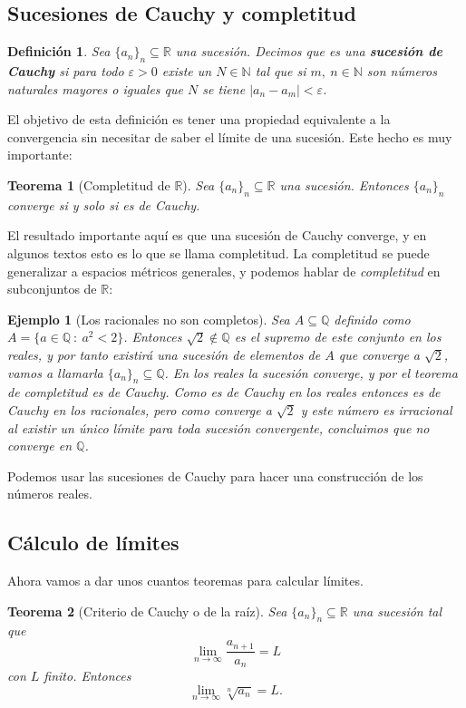 \documentclass{article}
\newtheorem{theorem}{Teorema}
\newtheorem{define}{Definición}
\newtheorem{ejem}{Ejemplo}
\newcommand{\reales}{\mathbb{R}}
\newcommand{\naturales}{\mathbb{N}}
\newcommand{\racionales}{\mathbb{Q}}
\newcommand{\sucesion}[1]{\{ #1 _n \}_n}
\newcommand{\sucreal}[1]{\{ #1 _n \}_n \subseteq \reales}
\begin{document}
\subsection{Sucesiones de Cauchy y completitud}
\begin{define}
	Sea $\sucreal{a}$ una sucesión. Decimos que es una \textbf{sucesión de Cauchy} si para todo $\varepsilon > 0$ existe un $N \in \naturales$ tal que si $m,\ n \in \naturales$ son números naturales mayores o iguales que $N$ se tiene $|a_n - a_m| < \varepsilon$.
\end{define}
El objetivo de esta definición es tener una propiedad equivalente a la convergencia sin necesitar de saber el límite de una sucesión. Este hecho es muy importante:
\begin{theorem}[Completitud de $\reales$]
	Sea $\sucreal{a}$ una sucesión. Entonces $\sucesion{a}$ converge si y solo si es de Cauchy.
\end{theorem}
El resultado importante aquí es que una sucesión de Cauchy converge, y en algunos textos esto es lo que se llama completitud.
La completitud se puede generalizar a espacios métricos generales, y podemos hablar de \textit{completitud} en subconjuntos de $\reales$:
\begin{ejem}[Los racionales no son completos]
	Sea $A \subseteq \racionales$ definido como $A = \{ a\in \racionales\ :\ a^2 < 2\}$. Entonces $\sqrt{2} \not\in \racionales$ es el supremo de este conjunto en los reales, y por tanto existirá una sucesión de elementos de $A$ que converge a $\sqrt{2}$, vamos a llamarla $\sucesion{a} \subseteq \racionales$. En los reales la sucesión converge, y por el teorema de completitud es de Cauchy. Como es de Cauchy en los reales entonces es de Cauchy en los racionales, pero como converge a $\sqrt{2}$ y este número es irracional al existir un único límite para toda sucesión convergente, concluimos que no converge en $\racionales$.
\end{ejem}
Podemos usar las sucesiones de Cauchy para hacer una construcción de los números reales.








\subsection{Cálculo de límites}
Ahora vamos a dar unos cuantos teoremas para calcular límites.

\begin{theorem}[Criterio de Cauchy o de la raíz]
	Sea $\sucreal{a}$ una sucesión tal que
	\begin{equation*}
		\lim_{n \rightarrow \infty} \frac{a_{n+1}}{a_n} = L
	\end{equation*}
	con $L$ finito. Entonces
	\begin{equation*}
		\lim_{n \rightarrow \infty} \sqrt[n]{a_n} = L.
	\end{equation*}
\end{theorem}
\end{document}

